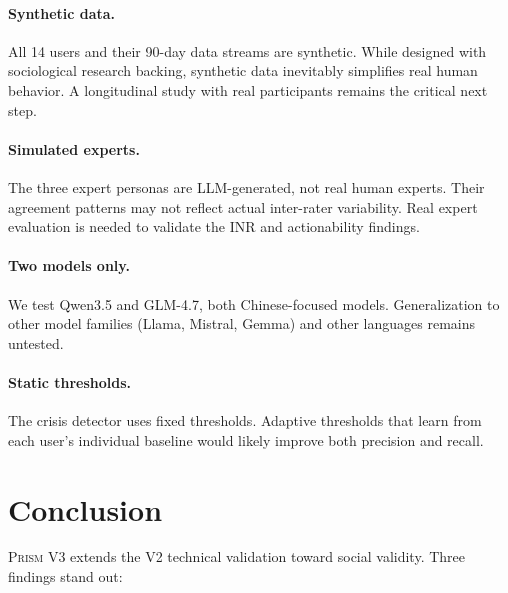 \documentclass[11pt,a4paper]{article}
\newcommand{\echostream}{\textsc{Prism}}
\begin{document}
\paragraph{Synthetic data.} All 14 users and their 90-day data streams are
synthetic. While designed with sociological research backing, synthetic data
inevitably simplifies real human behavior. A longitudinal study with real
participants remains the critical next step.

\paragraph{Simulated experts.} The three expert personas are LLM-generated,
not real human experts. Their agreement patterns may not reflect actual
inter-rater variability. Real expert evaluation is needed to validate the
INR and actionability findings.

\paragraph{Two models only.} We test Qwen3.5 and GLM-4.7, both Chinese-focused
models. Generalization to other model families (Llama, Mistral, Gemma) and
other languages remains untested.

\paragraph{Static thresholds.} The crisis detector uses fixed thresholds.
Adaptive thresholds that learn from each user's individual baseline would
likely improve both precision and recall.


\section{Conclusion}
\label{sec:conclusion}

\echostream{} V3 extends the V2 technical validation toward social validity.
Three findings stand out:
\end{document}
